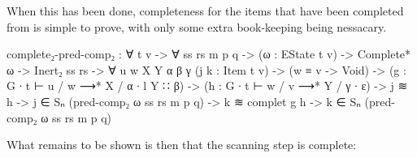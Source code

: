 		When this has been done, completeness for the items that have been
		completed from  is simple to prove, with only some
		extra book-keeping being nessacary.

		\begin{code}
			  complete₂-pred-comp₂ : ∀ {t v} -> ∀ ss rs m p q ->
			    (ω : EState t v) ->
			    Complete* ω ->
			    Inert₂ ss rs ->
			    ∀ {u w X Y α β γ}
			    (j k : Item t v) ->
			    (w ≡ v -> Void) ->
			    (g : G ∙ t ⊢ u / w ⟶* X / α ∙ l Y ∷ β) ->
			    (h : G ∙ t ⊢ w / v ⟶* Y / γ ∙ ε) ->
			    j ≋ h -> j ∈ Sₙ (pred-comp₂ ω ss rs m p q) ->
			    k ≋ complet g h ->
			      k ∈ Sₙ (pred-comp₂ ω ss rs m p q)
		\end{code}

		What remains to be shown is then that the scanning step is complete:

